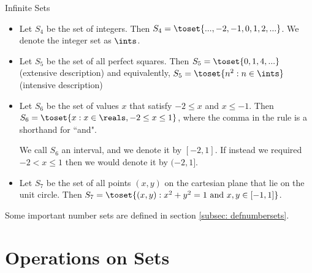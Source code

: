 \begin{expl}{Infinite Sets}
  \begin{itemize}
    \item Let $S_4$ be the set of integers. Then
    $S_4 = \toset{..., -2, -1, 0, 1, 2, ...}$. We denote the integer set
    as $\ints$.

    \item Let $S_5$ be the set of all perfect squares. Then
    $S_5 = \toset{0, 1, 4, ...}$ (extensive description) and equivalently,
    $S_5 = \toset{n^2 : n \in \ints }$ (intensive description)

    \item Let $S_6$ be the set of values $x$ that satisfy $-2 \leq x$ and
    $x \leq -1$. Then $S_6 = \toset{x : x \in \reals, -2 \leq x \leq 1}$,
    where the comma in the rule is a shorthand for ``and".

    We call $S_6$ an interval, and we denote it by $[-2, 1]$. If instead we
    required $-2 < x \leq 1$ then we would denote it by $(-2, 1]$.

    \item Let $S_7$ be the set of all points $(x, y)$ on the cartesian plane
    that lie on the unit circle. Then $S_7 = \toset{ (x, y) :
    x^2 + y^2 = 1 \text{ and } x, y \in [-1, 1]}$.
  \end{itemize}
\end{expl}

Some important number sets are defined in section \ref{subsec: defnumbersets}.

\section{Operations on Sets}

